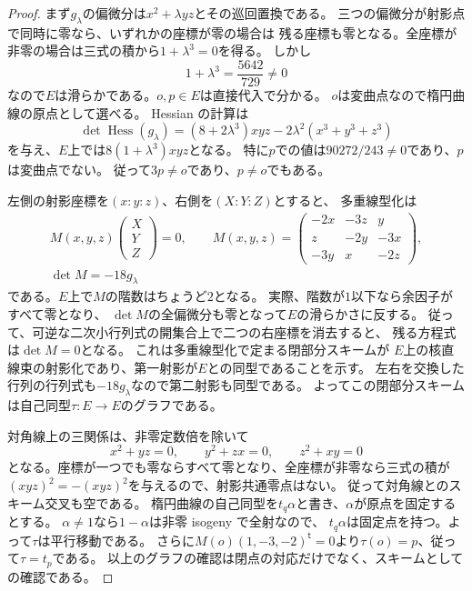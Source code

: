 \begin{proof}
まず$g_\lambda$の偏微分は$x^2+\lambda yz$とその巡回置換である。
三つの偏微分が射影点で同時に零なら、いずれかの座標が零の場合は
残る座標も零となる。全座標が非零の場合は三式の積から$1+\lambda^3=0$を得る。
しかし
\[
 1+\lambda^3=\frac{5642}{729}\ne0
\]
なので$E$は滑らかである。$o,p\in E$は直接代入で分かる。
$o$は変曲点なので楕円曲線の原点として選べる。
Hessian の計算は
\[
 \det\operatorname{Hess}(g_\lambda)
  =(8+2\lambda^3)xyz-2\lambda^2(x^3+y^3+z^3)
\]
を与え、$E$上では$8(1+\lambda^3)xyz$となる。
特に$p$での値は$90272/243\ne0$であり、$p$は変曲点でない。
従って$3p\ne o$であり、$p\ne o$でもある。

左側の射影座標を$(x:y:z)$、右側を$(X:Y:Z)$とすると、
多重線型化は
\begin{equation}\label{esi:eq:graph-matrix}
 \begin{gathered}
  M(x,y,z)\begin{pmatrix}X\\Y\\Z\end{pmatrix}=0,
  \qquad
  M(x,y,z)=
  \begin{pmatrix}
   -2x&-3z&y\\ z&-2y&-3x\\ -3y&x&-2z
  \end{pmatrix},\\
  \det M=-18g_\lambda
 \end{gathered}
\end{equation}
である。$E$上で$M$の階数はちょうど$2$となる。
実際、階数が$1$以下なら余因子がすべて零となり、
$\det M$の全偏微分も零となって$E$の滑らかさに反する。
従って、可逆な二次小行列式の開集合上で二つの右座標を消去すると、
残る方程式は$\det M=0$となる。
これは多重線型化で定まる閉部分スキームが
$E$上の核直線束の射影化であり、第一射影が$E$との同型であることを示す。
左右を交換した行列の行列式も$-18g_\lambda$なので第二射影も同型である。
よってこの閉部分スキームは自己同型$\tau:E\to E$のグラフである。

対角線上の三関係は、非零定数倍を除いて
\[
 x^2+yz=0,\qquad y^2+zx=0,\qquad z^2+xy=0
\]
となる。座標が一つでも零ならすべて零となり、全座標が非零なら三式の積が
$(xyz)^2=-(xyz)^2$を与えるので、射影共通零点はない。
従って対角線とのスキーム交叉も空である。
楕円曲線の自己同型を$t_q\alpha$と書き、$\alpha$が原点を固定するとする。
$\alpha\ne1$なら$1-\alpha$は非零 isogeny で全射なので、
$t_q\alpha$は固定点を持つ。よって$\tau$は平行移動である。
さらに$M(o)(1,-3,-2)^{\mathsf t}=0$より$\tau(o)=p$、従って$\tau=t_p$である。
以上のグラフの確認は閉点の対応だけでなく、スキームとしての確認である。


\end{proof}
